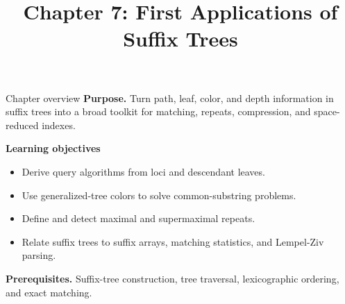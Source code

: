 \documentclass[11pt,letterpaper]{article}
\title{Chapter 7: First Applications of Suffix Trees}
\author{}
\date{}
\begin{document}
\maketitle

\begin{CornellOverviewBox}{Chapter overview}
\textbf{Purpose.} Turn path, leaf, color, and depth information in suffix trees into a broad toolkit for matching, repeats, compression, and space-reduced indexes.

\textbf{Learning objectives}
\begin{itemize}
  \item Derive query algorithms from loci and descendant leaves.
  \item Use generalized-tree colors to solve common-substring problems.
  \item Define and detect maximal and supermaximal repeats.
  \item Relate suffix trees to suffix arrays, matching statistics, and Lempel-Ziv parsing.
\end{itemize}

\textbf{Prerequisites.} Suffix-tree construction, tree traversal, lexicographic ordering, and exact matching.
\end{CornellOverviewBox}
\end{document}
